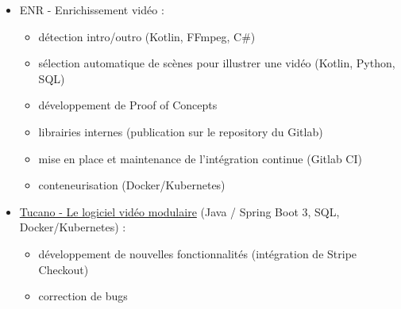 \documentclass[11pt,a4paper]{moderncv}
\newcounter{dobyear}\setcounter{dobyear}{1989}
\newcounter{age}\setcounter{age}{\the\year - \thedobyear}
\begin{document}
{\begin{itemize}
\begin{itemize}
            \item mise en place et maintenance de l'intégration continue (Gitlab CI)
        \end{itemize}
        \item ENR - Enrichissement vidéo :
        \begin{itemize}
            \item détection intro/outro (Kotlin, FFmpeg, C\#)
            \item sélection automatique de scènes pour illustrer une vidéo (Kotlin, Python, SQL)
            \item développement de Proof of Concepts
            \item librairies internes (publication sur le repository du Gitlab)
            \item mise en place et maintenance de l'intégration continue (Gitlab CI)
            \item conteneurisation (Docker/Kubernetes)
        \end{itemize}
        \item \href{https://www.alphanetworks.tv/en/products/tucano/overview}{Tucano - Le logiciel vidéo modulaire} (Java / Spring Boot 3, SQL, Docker/Kubernetes) :
        \begin{itemize}
              \item développement de nouvelles fonctionnalités (intégration de Stripe Checkout)
              \item correction de bugs
        \end{itemize}
    \end{itemize}
}



\end{document}
